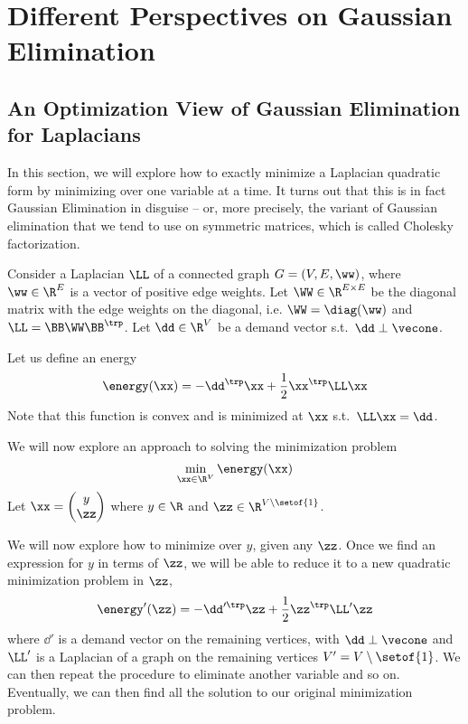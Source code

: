 \chapter{Different Perspectives on Gaussian
  Elimination}
\label{cha:ge}
%


%
\sloppy


\section{An Optimization View of Gaussian Elimination for Laplacians}
In this section, we will explore how to exactly minimize a Laplacian
quadratic form by minimizing over one variable at a time.
It turns out that this is in fact Gaussian Elimination in disguise --
or, more precisely, the variant of Gaussian elimination that we tend
to use on symmetric matrices, which is called Cholesky factorization.

Consider a Laplacian $\LL$ of a connected graph $G = (V,E,\ww)$, where
$\ww \in \R^E$ is a vector of positive edge weights.
Let $\WW \in \R^{E \times E}$ be the diagonal matrix with the edge
weights on the diagonal, i.e. $\WW = \diag(\ww)$ and
$\LL = \BB\WW\BB^\trp$.
Let $\dd \in \R^V$ be a demand vector s.t.\ $ \dd \perp \vecone$.

Let us define an energy
\[
  \energy(\xx) =
-\dd^\trp\xx +
  \frac{1}{2}\xx^\trp\LL\xx
\]
Note that this function is convex and is minimized at $\xx$ s.t.\ $\LL
\xx = \dd$.

We will now explore an approach to solving the minimization problem
\[
\min_{\xx \in \R^V } \energy(\xx)
  \]
%
Let $\xx =
\begin{pmatrix}
  y \\ \zz
\end{pmatrix}$ where $y \in \R$ and $\zz \in \R^{V \setminus
  \setof{1}}$.

We will now explore how to minimize over $y$, given any $\zz$.
Once we find an expression for $y$ in terms of $\zz$,
we will be able to reduce  it to a
new quadratic minimization problem in $\zz$,
\[
  \energy'(\zz) =
-\dd'^\trp\zz +
  \frac{1}{2}\zz^\trp\LL'\zz
\]
where $\dd'$ is a demand vector on the remaining vertices, with $\dd
\perp \vecone$ and $\LL'$ is a Laplacian of a graph on the remaining
vertices $V' = V \setminus \setof{1}$.
We can then repeat the procedure to eliminate another variable and so on.
Eventually, we can then find all the solution to our original
minimization problem.

